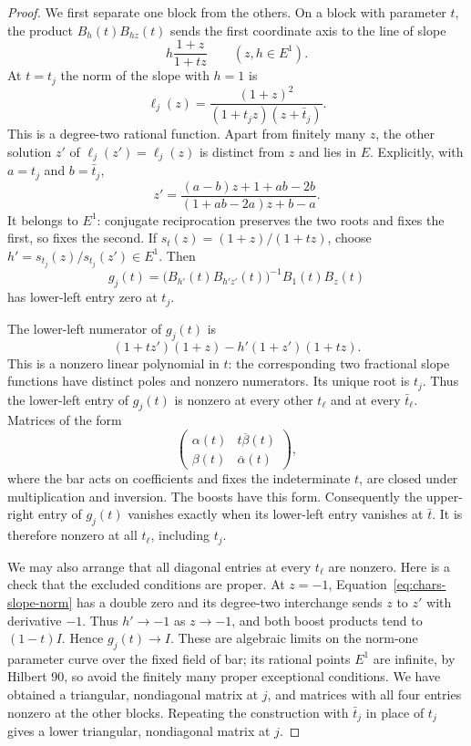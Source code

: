 \begin{proof}
We first separate one block from the others. On a block with parameter
$t$, the product $B_h(t)B_{hz}(t)$ sends the first coordinate axis to
the line of slope
\[
 h\frac{1+z}{1+tz}\qquad(z,h\in E^1).
\]
At $t=t_j$ the norm of the slope with $h=1$ is
\begin{equation}\label{eq:chars-slope-norm}
 \ell_j(z)=\frac{(1+z)^2}{(1+t_jz)(z+\bar t_j)}.
\end{equation}
This is a degree-two rational function. Apart from finitely many $z$,
the other solution $z'$ of $\ell_j(z')=\ell_j(z)$ is distinct from
$z$ and lies in $E$. Explicitly, with $a=t_j$ and $b=\bar t_j$,
\[
 z'=\frac{(a-b)z+1+ab-2b}{(1+ab-2a)z+b-a}.
\]
It belongs to $E^1$: conjugate reciprocation
preserves the two roots and fixes the first, so fixes the second.
If $s_t(z)=(1+z)/(1+tz)$, choose
$h'=s_{t_j}(z)/s_{t_j}(z')\in E^1$. Then
\[
 g_j(t)=\bigl(B_{h'}(t)B_{h'z'}(t)\bigr)^{-1}B_1(t)B_z(t)
\]
has lower-left entry zero at $t_j$.

The lower-left numerator of $g_j(t)$ is
\[
 (1+tz')(1+z)-h'(1+z')(1+tz).
\]
This is a nonzero linear polynomial in $t$: the corresponding two
fractional slope functions have distinct poles and nonzero numerators.
Its unique root is $t_j$. Thus the
lower-left entry of $g_j(t)$ is nonzero at every other $t_\ell$ and at
every $\bar t_\ell$. Matrices of the form
\[
 \begin{pmatrix}\alpha(t)&t\overline{\beta}(t)\\
                 \beta(t)&\overline{\alpha}(t)\end{pmatrix},
\]
where the bar acts on coefficients and fixes the indeterminate $t$,
are closed under multiplication and inversion. The boosts have this
form. Consequently the upper-right entry of $g_j(t)$ vanishes exactly
when its lower-left entry vanishes at $\bar t$. It is therefore
nonzero at all $t_\ell$, including $t_j$.

We may also arrange that all diagonal entries at every $t_\ell$ are
nonzero. Here is a check that the excluded conditions are proper.
At $z=-1$, Equation~\ref{eq:chars-slope-norm} has a double zero and its
degree-two interchange sends $z$ to $z'$ with derivative $-1$.
Thus $h'\to-1$ as $z\to-1$, and both boost products tend to
$(1-t)I$. Hence $g_j(t)\to I$. These are algebraic limits on the
norm-one parameter curve over the fixed field of bar; its rational
points $E^1$ are infinite, by Hilbert 90, so avoid the finitely many
proper exceptional conditions.
We have obtained a triangular, nondiagonal matrix at $j$, and matrices
with all four entries nonzero at the other blocks. Repeating the
construction with $\bar t_j$ in place of $t_j$ gives a lower triangular,
nondiagonal matrix at $j$.


\end{proof}
